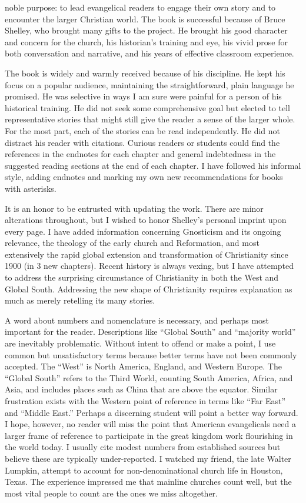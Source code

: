 
 noble purpose: to lead evangelical readers to engage their own story
and to encounter the larger Christian world. The book is successful because of Bruce Shelley, who
brought many gifts to the project. He brought his good character and concern for the church, his
historian’s training and eye, his vivid prose for both conversation and narrative, and his years of
effective classroom experience.

The book is widely and warmly received because of his discipline. He kept his focus on a popular
audience, maintaining the straightforward, plain language he promised. He was selective in ways I am
sure were painful for a person of his historical training. He did not seek some comprehensive goal
but elected to tell representative stories that might still give the reader a sense of the larger
whole. For the most part, each of the stories can be read independently. He did not distract his
reader with citations. Curious readers or students could find the references in the endnotes for
each chapter and general indebtedness in the suggested reading sections at the end of each chapter.
I have followed his informal style, adding endnotes and marking my own new recommendations for books
with asterisks.

It is an honor to be entrusted with updating the work. There are minor alterations throughout, but I
wished to honor Shelley’s personal imprint upon every page. I have added information concerning
Gnosticism and its ongoing relevance, the theology of the early church and Reformation, and most
extensively the rapid global extension and transformation of Christianity since 1900 (in 3 new
chapters). Recent history is always vexing, but I have attempted to address the surprising
circumstance of Christianity in both the West and Global South. Addressing the new shape of
Christianity requires explanation as much as merely retelling its many stories.

A word about numbers and nomenclature is necessary, and perhaps most important for the reader.
Descriptions like “Global South” and “majority world” are inevitably problematic. Without intent to
offend or make a point, I use common but unsatisfactory terms because better terms have not been
commonly accepted. The “West” is North America, England, and Western Europe. The “Global South”
refers to the Third World, counting South America, Africa, and Asia, and includes places such as
China that are above the equator. Similar frustration exists with the Western point of reference in
terms like “Far East” and “Middle East.” Perhaps a discerning student will point a better way
forward. I hope, however, no reader will miss the point that American evangelicals need a larger
frame of reference to participate in the great kingdom work flourishing in the world today. I
usually cite modest numbers from established sources but believe these are typically under-reported.
I watched my friend, the late Walter Lumpkin, attempt to account for non-denominational church life
in Houston, Texas. The experience impressed me that mainline churches count well, but the most vital
people to count are the ones we miss altogether.

